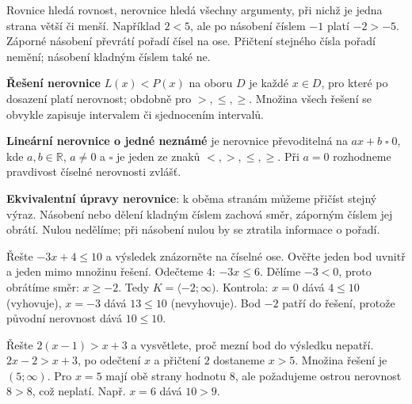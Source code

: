 \documentclass[11pt,a4paper]{article}
\begin{document}
Rovnice hledá rovnost, nerovnice hledá všechny argumenty, při nichž je jedna strana větší či menší. Například $2<5$, ale po násobení číslem $-1$ platí $-2>-5$. Záporné násobení převrátí pořadí čísel na ose. Přičtení stejného čísla pořadí nemění; násobení kladným číslem také ne.
\begin{definiceBox}
\textbf{Řešení nerovnice} $L(x)<P(x)$ na oboru $D$ je každé $x\in D$, pro které po dosazení platí nerovnost; obdobně pro $>,\le,\ge$. Množina všech řešení se obvykle zapisuje intervalem či sjednocením intervalů.
\end{definiceBox}
\begin{definiceBox}
\textbf{Lineární nerovnice o jedné neznámé} je nerovnice převoditelná na $ax+b\mathrel{\square}0$, kde $a,b\in\mathbb R$, $a\ne0$ a $\square$ je jeden ze znaků $<,>,\le,\ge$. Při $a=0$ rozhodneme pravdivost číselné nerovnosti zvlášť.
\end{definiceBox}
\begin{definiceBox}
\textbf{Ekvivalentní úpravy nerovnice}: k oběma stranám můžeme přičíst stejný výraz. Násobení nebo dělení kladným číslem zachová směr, záporným číslem jej obrátí. Nulou nedělíme; při násobení nulou by se ztratila informace o pořadí.
\end{definiceBox}
\begin{prikladReseniBox}
Řešte $-3x+4\le10$ a výsledek znázorněte na číselné ose. Ověřte jeden bod uvnitř a jeden mimo množinu řešení.
\tcblower
Odečteme $4$: $-3x\le6$. Dělíme $-3<0$, proto obrátíme směr: $x\ge-2$. Tedy $K=\langle-2;\infty)$. Kontrola: $x=0$ dává $4\le10$ (vyhovuje), $x=-3$ dává $13\le10$ (nevyhovuje). Bod $-2$ patří do řešení, protože původní nerovnost dává $10\le10$.
\end{prikladReseniBox}
\begin{center}
\end{center}
\begin{prikladReseniBox}
Řešte $2(x-1)>x+3$ a vysvětlete, proč mezní bod do výsledku nepatří.
\tcblower
$2x-2>x+3$, po odečtení $x$ a přičtení $2$ dostaneme $x>5$. Množina řešení je $(5;\infty)$. Pro $x=5$ mají obě strany hodnotu $8$, ale požadujeme ostrou nerovnost $8>8$, což neplatí. Např. $x=6$ dává $10>9$.
\end{prikladReseniBox}
\end{document}
